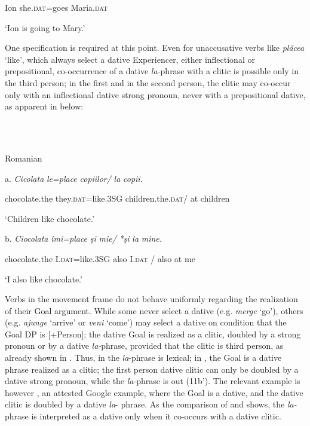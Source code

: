 \documentclass[output=paper,colorlinks,citecolor=brown]{./langscibook}
\begin{document}
    Ion   she.\textsc{dat}=goes   Maria.\textsc{dat}

    ‘Ion is going to Mary.’

One specification is required at this point. Even for unaccusative verbs like \textit{plăcea} ‘like’, which always select a dative Experiencer, either inflectional or prepositional, co-occurrence of a dative \textit{la-}phrase with a clitic is possible only in the third person; in the first and in the second person, the clitic may co-occur only with an inflectional dative strong pronoun, never with a prepositional dative, as apparent in  below:

\ea%
    \label{ex:key:10}
    \gll\\
        \\
    \glt
    \z

          Romanian

  a.  \textit{Cicolata}  \textit{le=place}     \textit{copiilor/}  \textit{la} \textit{copii.}

    chocolate.the  they.\textsc{dat}=like.3SG  children.the.\textsc{dat}/ at children

    ‘Children like chocolate.’

  b.  \textit{Ciocolata}  \textit{îmi=place}   \textit{şi} \textit{mie/}     \textit{*şi}  \textit{la} \textit{mine.}

    chocolate.the  I.\textsc{dat}=like.3SG  also I.\textsc{dat} /  also at me

    ‘I also like chocolate.’  

Verbs in the movement frame do not behave uniformly regarding the realization of their Goal argument. While some never select a dative (e.g. \textit{merge} ‘go’), others (e.g. \textit{ajunge} ‘arrive’ or \textit{veni} ‘come’) may select a dative on condition that the Goal DP is [+Person]; the dative Goal is realized as a clitic, doubled by a strong pronoun or by a dative \textit{la-}phrase, provided that the clitic is third person, as already shown in . Thus, in  the \textit{la}{}-phrase is lexical; in , the Goal is a dative phrase realized as a clitic; the first person dative clitic can only be doubled by a dative strong pronoun, while the \textit{la}{}-phrase is out (11b’). The relevant example is however , an attested Google example, where the Goal is a dative, and the dative clitic is doubled by a dative \textit{la}{}- phrase. As the comparison of  and  shows, the \textit{la-}phrase is interpreted as a dative only when it co-occurs with a dative clitic.
\end{document}
